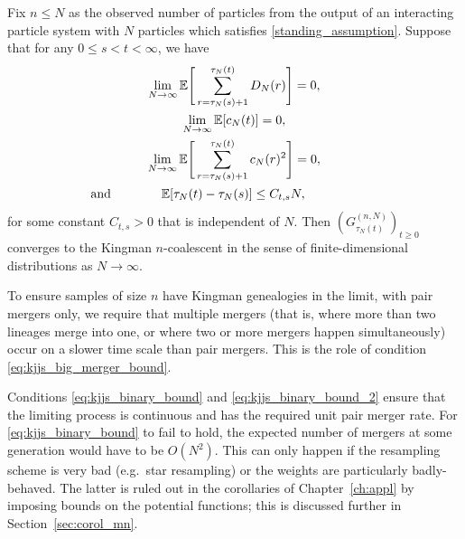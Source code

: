 \begin{theorem}\label{thm:kjjs_mainthm}
Fix $n \leq N$ as the observed number of particles from the output of an interacting particle system with $N$ particles which satisfies \ref{standing_assumption}.
Suppose that for any $0 \leq s < t < \infty$, we have
\begin{gather}\label{eq:kjjs_big_merger_bound}
\lim_{ N \rightarrow \infty } \E\Bigg[ \sum_{ r = \tau_N( s ) + 1 }^{ \tau_N( t ) } D_N( r ) \Bigg] = 0, \\
\label{eq:kjjs_binary_bound}
\lim_{ N \rightarrow \infty } \E[ c_N( t ) ] = 0, \\
\label{eq:kjjs_binary_bound_2}
\lim_{ N \rightarrow \infty } \E\Bigg[ \sum_{ r = \tau_N( s ) + 1 }^{ \tau_N( t ) } c_N( r )^2 \Bigg] = 0, \\
\label{eq:kjjs_tau_bound}
\text{and}\qquad\qquad\E[ \tau_N( t ) - \tau_N( s ) ] \leq C_{ t, s } N,\qquad\qquad\phantom{\text{and}}
\end{gather}
for some constant $C_{ t, s } > 0$ that is independent of $N$.
Then $( G_{ \tau_N( t ) }^{ ( n, N ) } )_{ t \geq 0 }$ converges to the Kingman $n$-coalescent in the sense of finite-dimensional distributions as $N \rightarrow \infty$. 
\end{theorem}

To ensure samples of size $n$ have Kingman genealogies in the limit, with pair mergers only, we require that multiple mergers (that is, where more than two lineages merge into one, or where two or more mergers happen simultaneously) occur on a slower time scale than pair mergers. 
This is the role of condition \eqref{eq:kjjs_big_merger_bound}.

Conditions \eqref{eq:kjjs_binary_bound} and \eqref{eq:kjjs_binary_bound_2} ensure that the limiting process is continuous and has the required unit pair merger rate.
For \eqref{eq:kjjs_binary_bound} to fail to hold, the expected number of mergers at some generation would have to be $O(N^2)$. This can only happen if the resampling scheme is very bad (e.g.\ star resampling) or the weights are particularly badly-behaved. The latter is ruled out in the corollaries of Chapter~\ref{ch:appl} by imposing bounds on the potential functions; this is discussed further in Section~\ref{sec:corol_mn}.

